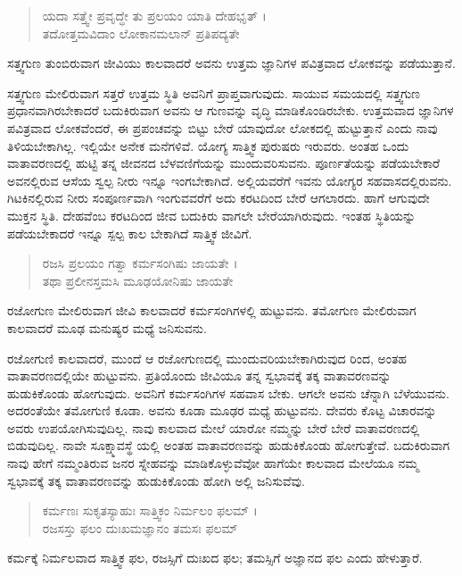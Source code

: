\begin{verse}
ಯದಾ ಸತ್ತ್ವೇ ಪ್ರವೃದ್ಧೇ ತು ಪ್ರಲಯಂ ಯಾತಿ ದೇಹಭೃತ್ ।\\ತದೋತ್ತಮವಿದಾಂ ಲೋಕಾನಮಲಾನ್ ಪ್ರತಿಪದ್ಯತೇ 
\end{verse}

{\small ಸತ್ತ್ವಗುಣ ತುಂಬಿರುವಾಗ ಜೀವಿಯು ಕಾಲವಾದರೆ ಅವನು ಉತ್ತಮ ಜ್ಞಾನಿಗಳ ಪವಿತ್ರವಾದ ಲೋಕವನ್ನು ಪಡೆಯುತ್ತಾನೆ.}

ಸತ್ತ್ವಗುಣ ಮೇಲಿರುವಾಗ ಸತ್ತರೆ ಉತ್ತಮ ಸ್ಥಿತಿ ಅವನಿಗೆ ಪ್ರಾಪ್ತವಾಗುವುದು. ಸಾಯುವ ಸಮಯದಲ್ಲಿ ಸತ್ತ್ವಗುಣ ಪ್ರಧಾನವಾಗಿರಬೇಕಾದರೆ ಬದುಕಿರುವಾಗ ಅವನು ಆ ಗುಣವನ್ನು ವೃದ್ಧಿ ಮಾಡಿಕೊಂಡಿರಬೇಕು. ಉತ್ತಮವಾದ ಜ್ಞಾನಿಗಳ ಪವಿತ್ರವಾದ ಲೋಕವೆಂದರೆ, ಈ ಪ್ರಪಂಚವನ್ನು ಬಿಟ್ಟು ಬೇರೆ ಯಾವುದೋ ಲೋಕದಲ್ಲಿ ಹುಟ್ಟುತ್ತಾನೆ ಎಂದು ನಾವು ತಿಳಿಯಬೇಕಾಗಿಲ್ಲ. ಇಲ್ಲಿಯೇ ಅನೇಕ ಮನೆಗಳಿವೆ. ಯೋಗ್ಯ ಸಾತ್ತ್ವಿಕ ಪುರುಷರು ಇರುವರು. ಅಂತಹ ಒಂದು ವಾತಾವರಣದಲ್ಲಿ ಹುಟ್ಟಿ ತನ್ನ ಜೀವನದ ಬೆಳವಣಿಗೆಯನ್ನು ಮುಂದುವರಿಸುವನು. ಪೂರ್ಣತೆಯನ್ನು ಪಡೆಯಬೇಕಾರೆ ಅವನಲ್ಲಿರುವ ಆಸೆಯ ಸ್ವಲ್ಪ ನೀರು ಇನ್ನೂ ಇಂಗಬೇಕಾಗಿದೆ. ಅಲ್ಲಿಯವರೆಗೆ ಇವನು ಯೋಗ್ಯರ ಸಹವಾಸದಲ್ಲಿರುವನು. ಗಿಟಕಿನಲ್ಲಿರುವ ನೀರು ಸಂಪೂರ್ಣವಾಗಿ ಇಂಗುವವರೆಗೆ ಅದು ಕರಟದಿಂದ ಬೇರೆ ಆಗಲಾರದು. ಹಾಗೆ ಆಗುವುದೇ ಮುಕ್ತನ ಸ್ಥಿತಿ. ದೇಹವೆಂಬ ಕರಟದಿಂದ ಜೀವ ಬದುಕಿರು ವಾಗಲೇ ಬೇರೆಯಾಗಿರುವುದು. ಇಂತಹ ಸ್ಥಿತಿಯನ್ನು ಪಡೆಯಬೇಕಾದರೆ ಇನ್ನೂ ಸ್ಪಲ್ಪ ಕಾಲ ಬೇಕಾಗಿದೆ ಸಾತ್ತ್ವಿಕ ಜೀವಿಗೆ.

\begin{verse}
ರಜಸಿ ಪ್ರಲಯಂ ಗತ್ವಾ ಕರ್ಮಸಂಗಿಷು ಜಾಯತೇ ।\\ತಥಾ ಪ್ರಲೀನಸ್ತಮಸಿ ಮೂಢಯೋನಿಷು ಜಾಯತೇ 
\end{verse}

{\small ರಜೋಗುಣ ಮೇಲಿರುವಾಗ ಜೀವಿ ಕಾಲವಾದರೆ ಕರ್ಮಸಂಗಿಗಳಲ್ಲಿ ಹುಟ್ಟುವನು. ತಮೋಗುಣ ಮೇಲಿರುವಾಗ ಕಾಲವಾದರೆ ಮೂಢ ಮನುಷ್ಯರ ಮಧ್ಯೆ ಜನಿಸುವನು.}

ರಜೋಗುಣಿ ಕಾಲವಾದರೆ, ಮುಂದೆ ಆ ರಜೋಗುಣದಲ್ಲಿ ಮುಂದುವರಿಯಬೇಕಾಗಿರುವುದ ರಿಂದ, ಅಂತಹ ವಾತಾವರಣದಲ್ಲಿಯೇ ಹುಟ್ಟುವನು. ಪ್ರತಿಯೊಂದು ಜೀವಿಯೂ ತನ್ನ ಸ್ವಭಾವಕ್ಕೆ ತಕ್ಕ ವಾತಾವರಣವನ್ನು ಹುಡುಕಿಕೊಂಡು ಹೋಗುವುದು. ಅವನಿಗೆ ಕರ್ಮಸಂಗಿಗಳ ಸಹವಾಸ ಬೇಕು. ಆಗಲೇ ಅವನು ಚೆನ್ನಾಗಿ ಬೆಳೆಯುವನು. ಅದರಂತೆಯೇ ತಮೋಗುಣಿ ಕೂಡಾ. ಅವನು ಕೂಡಾ ಮೂಢರ ಮಧ್ಯೆ ಹುಟ್ಟುವನು. ದೇವರು ಕೊಟ್ಟ ವಿಚಾರವನ್ನು ಅವರು ಉಪಯೋಗಿಸುವುದಿಲ್ಲ. ನಾವು ಕಾಲವಾದ ಮೇಲೆ ಯಾರೋ ನಮ್ಮನ್ನು ಬೇರೆ ಬೇರೆ ವಾತಾವರಣದಲ್ಲಿ ಬಿಡುವುದಿಲ್ಲ. ನಾವೇ ಸೂಕ್ಷ್ಮಾವಸ್ಥೆ ಯಲ್ಲಿ ಅಂತಹ ವಾತಾವರಣವನ್ನು ಹುಡುಕಿಕೊಂಡು ಹೋಗುತ್ತೇವೆ. ಬದುಕಿರುವಾಗ ನಾವು ಹೇಗೆ ನಮ್ಮಂತಿರುವ ಜನರ ಸ್ನೇಹವನ್ನು ಮಾಡಿಕೊಳ್ಳುವೆವೋ ಹಾಗೆಯೇ ಕಾಲವಾದ ಮೇಲೆಯೂ ನಮ್ಮ ಸ್ವಭಾವಕ್ಕೆ ತಕ್ಕ ವಾತಾವರಣವನ್ನು ಹುಡುಕಿಕೊಂಡು ಹೋಗಿ ಅಲ್ಲಿ ಜನಿಸುವೆವು.

\begin{verse}
ಕರ್ಮಣಃ ಸುಕೃತಸ್ಯಾಹುಃ ಸಾತ್ತ್ವಿಕಂ ನಿರ್ಮಲಂ ಫಲಮ್ ।\\ರಜಸಸ್ತು ಫಲಂ ದುಃಖಮಜ್ಞಾನಂ ತಮಸಃ ಫಲಮ್ 
\end{verse}

{\small ಕರ್ಮಕ್ಕೆ ನಿರ್ಮಲವಾದ ಸಾತ್ತ್ವಿಕ ಫಲ, ರಜಸ್ಸಿಗೆ ದುಃಖದ ಫಲ; ತಮಸ್ಸಿಗೆ ಅಜ್ಞಾನದ ಫಲ ಎಂದು ಹೇಳುತ್ತಾರೆ.}

